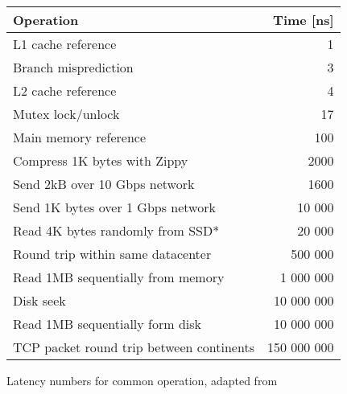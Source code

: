 \begin{figure}[H]
    
\begin{table}[H]
    \begin{center}
        \begin{tabular}{|l|r|}
            \hline
            \textbf{Operation}&\textbf{Time [ns]}\\
            \hline
             L1 cache reference&1\\
            \hline
             Branch misprediction&3  \\
            \hline
             L2 cache reference&4  \\
            \hline
             Mutex lock/unlock &17  \\
            \hline
             Main memory reference&100  \\
            \hline
             Compress 1K bytes with Zippy&2000  \\
            \hline
             Send 2kB over 10 Gbps network & 1600\\
            \hline
             Send 1K bytes over 1 Gbps network&10 000  \\
            \hline
             Read 4K bytes randomly from SSD* &20 000  \\
            \hline
             Round trip within same datacenter&500 000  \\
            \hline
             Read 1MB sequentially from memory&1 000 000  \\
            \hline
             Disk seek&10 000 000  \\
            \hline
             Read 1MB sequentially form disk&10 000 000  \\
            \hline
             TCP packet round trip between continents&150 000 000  \\
            \hline
        \end{tabular}
    \end{center}
\end{table}
\caption{Latency numbers for common operation, adapted from \cite{norvig_latency}}
\label{tab:latencynumbers}

\end{figure}
